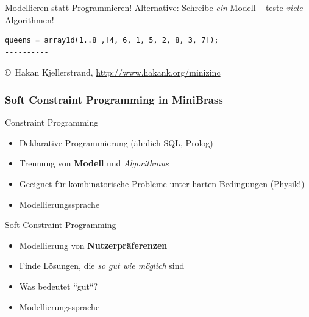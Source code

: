 \begin{frame}[fragile]{Modellieren statt Programmieren!}
\alert{Alternative}: Schreibe \emph{ein} Modell -- teste \emph{viele} Algorithmen!

\vspace*{1ex}



\small
\begin{verbatim}
queens = array1d(1..8 ,[4, 6, 1, 5, 2, 8, 3, 7]);
----------
\end{verbatim}
\copyright~Hakan Kjellerstrand, \url{http://www.hakank.org/minizinc}
\end{frame}

\begin{frame}
    \frametitle{Soft Constraint Programming in MiniBrass}
 \alert{Constraint Programming}
    \begin{itemize}
    \item Deklarative Programmierung (ähnlich SQL, Prolog)
    \item Trennung von \textbf{Modell} und \emph{Algorithmus}
    \item Geeignet für kombinatorische Probleme unter harten Bedingungen (Physik!)
    \item Modellierungssprache 
    \end{itemize}

    \vspace*{3ex}
    
\alert{Soft Constraint Programming}
    \begin{itemize} 
    \item Modellierung von \textbf{Nutzerpräferenzen}
    \item Finde Lösungen, die \emph{so gut wie möglich} sind
    \item Was bedeutet ``gut``?
    \item Modellierungssprache 
     \end{itemize}
\end{frame}

